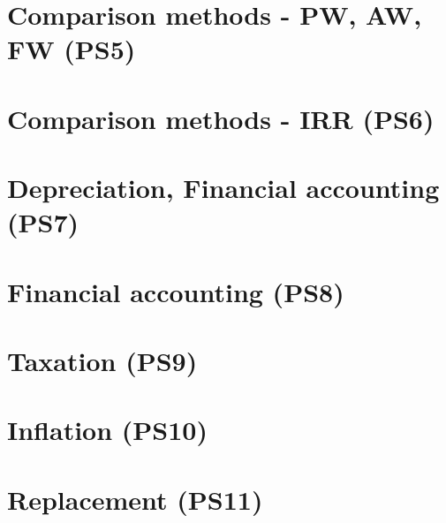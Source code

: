 \documentclass{article}
\begin{document}
\section{Comparison methods - PW, AW, FW (PS5)}

\newpage

\section{Comparison methods - IRR (PS6)}

\newpage

\section{Depreciation, Financial accounting (PS7)}

\newpage

\section{Financial accounting (PS8)}

\newpage

\section{Taxation (PS9)}

\newpage

\section{Inflation (PS10)}

\newpage

\section{Replacement (PS11)}

\end{document}

